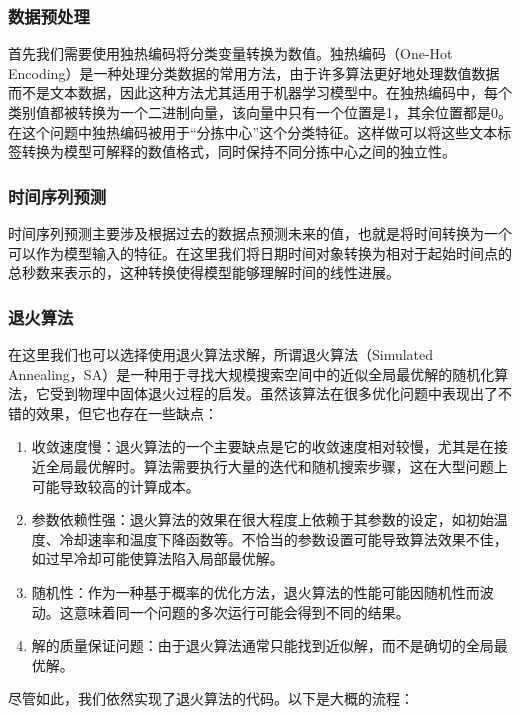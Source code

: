\documentclass[UTF8]{article}%
\begin{document}
\subsubsection{数据预处理}
首先我们需要使用独热编码将分类变量转换为数值。独热编码（One-Hot Encoding）是一种处理分类数据的常用方法，由于许多算法更好地处理数值数据而不是文本数据，因此这种方法尤其适用于机器学习模型中。在独热编码中，每个类别值都被转换为一个二进制向量，该向量中只有一个位置是1，其余位置都是0。在这个问题中独热编码被用于“分拣中心”这个分类特征。这样做可以将这些文本标签转换为模型可解释的数值格式，同时保持不同分拣中心之间的独立性。

\subsubsection{时间序列预测}

时间序列预测主要涉及根据过去的数据点预测未来的值，也就是将时间转换为一个可以作为模型输入的特征。在这里我们将日期时间对象转换为相对于起始时间点的总秒数来表示的，这种转换使得模型能够理解时间的线性进展。

\subsubsection{退火算法}
在这里我们也可以选择使用退火算法求解，所谓退火算法（Simulated Annealing，SA）是一种用于寻找大规模搜索空间中的近似全局最优解的随机化算法，它受到物理中固体退火过程的启发。虽然该算法在很多优化问题中表现出了不错的效果，但它也存在一些缺点：


\begin{enumerate}
    \item 收敛速度慢：退火算法的一个主要缺点是它的收敛速度相对较慢，尤其是在接近全局最优解时。算法需要执行大量的迭代和随机搜索步骤，这在大型问题上可能导致较高的计算成本。
    \item 参数依赖性强：退火算法的效果在很大程度上依赖于其参数的设定，如初始温度、冷却速率和温度下降函数等。不恰当的参数设置可能导致算法效果不佳，如过早冷却可能使算法陷入局部最优解。
    \item 随机性：作为一种基于概率的优化方法，退火算法的性能可能因随机性而波动。这意味着同一个问题的多次运行可能会得到不同的结果。
    \item 解的质量保证问题：由于退火算法通常只能找到近似解，而不是确切的全局最优解。
\end{enumerate}
尽管如此，我们依然实现了退火算法的代码。以下是大概的流程：
\end{document}
